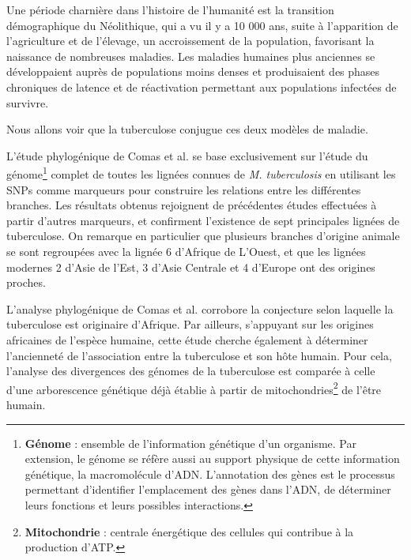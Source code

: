 \documentclass[twoside,a4paper,11pt,frenchb,openany]{report}
\begin{document}
Une période charnière dans l'histoire de l'humanité est la transition démographique du Néolithique, qui a vu il y a 10 000 ans, suite à l'apparition de l'agriculture et de l'élevage, un accroissement de la population, favorisant la naissance de nombreuses maladies. Les maladies humaines plus anciennes se développaient auprès de populations moins denses et produisaient des phases chroniques de latence et de réactivation permettant aux populations infectées de survivre.

Nous allons voir que la tuberculose conjugue ces deux modèles de maladie.


L'étude phylogénique de Comas et al.\cite{comas} se base exclusivement sur l'étude du génome\footnote{\textbf{Génome} : ensemble de l'information génétique d'un organisme. Par extension, le génome se réfère aussi au support physique de cette information génétique, la macromolécule d'ADN. L'annotation des gènes est le processus permettant d'identifier l'emplacement des gènes dans l'ADN, de déterminer leurs fonctions et leurs possibles interactions.} complet de toutes les lignées connues de \textit{M. tuberculosis} en utilisant les SNPs comme marqueurs pour construire les relations entre les différentes branches. Les résultats obtenus rejoignent de précédentes études effectuées à partir d'autres marqueurs, et confirment l'existence de sept principales lignées de tuberculose. On remarque en particulier que plusieurs branches d'origine animale se sont regroupées avec la lignée 6 d'Afrique de L'Ouest, et que les lignées modernes 2 d'Asie de l'Est, 3 d'Asie Centrale et 4 d'Europe ont des origines proches. 


L'analyse phylogénique de Comas et al. corrobore la conjecture selon laquelle la tuberculose est originaire d'Afrique. Par ailleurs, s'appuyant sur les origines africaines de l'espèce humaine, cette étude cherche également à déterminer l'ancienneté de l'association entre la tuberculose et son hôte humain. Pour cela, l'analyse des divergences des génomes de la tuberculose est comparée à celle d'une arborescence génétique déjà établie à partir de mitochondries\footnote{\textbf{Mitochondrie} : centrale énergétique des cellules qui contribue à la production d'ATP.} de l'être humain. 

\end{document}
